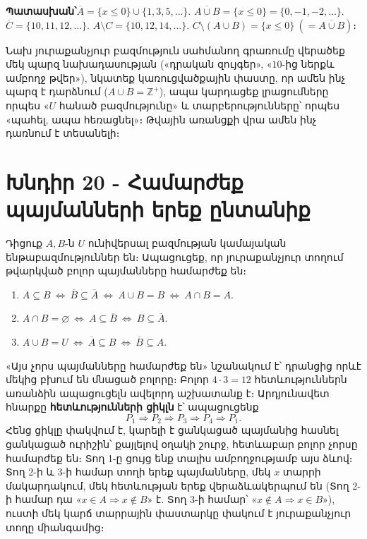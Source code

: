 \documentclass[11pt,a4paper]{article}
\newcommand{\Z}{\mathbb{Z}}
\newcommand{\answer}[1]{\begin{answerbox}\centering\textbf{Պատասխան՝}\quad #1\end{answerbox}}
\begin{document}
\answer{$\overline{A}=\{x\le 0\}\cup\{1,3,5,\dots\}$.\quad
$\overline{A\cup B}=\{x\le 0\}=\{0,-1,-2,\dots\}$.\quad
$\overline{C}=\{10,11,12,\dots\}$.\quad
$A\setminus C=\{10,12,14,\dots\}$.\quad
$C\setminus(A\cup B)=\{x\le 0\}\ (=\overline{A\cup B})$։}

\begin{methodbox}
Նախ յուրաքանչյուր բազմություն սահմանող գրառումը վերածեք մեկ պարզ նախադասության
(«դրական զույգեր», «$10$-ից ներքև ամբողջ թվեր»), նկատեք կառուցվածքային փաստը, որ ամեն ինչ պարզ է դարձնում
($A\cup B=\Z^{+}$), ապա կարդացեք լրացումները որպես «$U$ հանած բազմությունը» և տարբերությունները՝ որպես
«պահել, ապա հեռացնել»։ Թվային առանցքի վրա ամեն ինչ դառնում է տեսանելի։
\end{methodbox}

\section*{Խնդիր 20 - Համարժեք պայմանների երեք ընտանիք}

\begin{problembox}[20]
Դիցուք $A,B$-ն $U$ ունիվերսալ բազմության կամայական ենթաբազմություններ են։ Ապացուցեք, որ յուրաքանչյուր
տողում թվարկված բոլոր պայմանները համարժեք են։
\begin{enumerate}[label=\textbf{Տող \arabic*՝},leftmargin=2cm]
\item $A\subseteq B\ \Longleftrightarrow\ \overline{B}\subseteq\overline{A}\ \Longleftrightarrow\
A\cup B=B\ \Longleftrightarrow\ A\cap B=A$.
\item $A\cap B=\varnothing\ \Longleftrightarrow\ A\subseteq\overline{B}\ \Longleftrightarrow\
B\subseteq\overline{A}$.
\item $A\cup B=U\ \Longleftrightarrow\ \overline{A}\subseteq B\ \Longleftrightarrow\
\overline{B}\subseteq A$.
\end{enumerate}
\end{problembox}

\begin{ideabox}
«Այս չորս պայմանները համարժեք են» նշանակում է՝ դրանցից որևէ մեկից բխում են մնացած բոլորը։ Բոլոր
$4\cdot 3=12$ հետևություններն առանձին ապացուցելն ավելորդ աշխատանք է։ Արդյունավետ հնարքը
\textbf{հետևությունների ցիկլն} է՝ ապացուցենք
$$P_1\Rightarrow P_2\Rightarrow P_3\Rightarrow P_4\Rightarrow P_1.$$
Հենց ցիկլը փակվում է, կարելի է ցանկացած պայմանից հասնել ցանկացած ուրիշին՝ քայլելով օղակի շուրջ, հետևաբար
բոլոր չորսը համարժեք են։ Տող 1-ը ցույց ենք տալիս ամբողջությամբ այս ձևով։ Տող 2-ի և 3-ի համար տողի երեք
պայմանները, մեկ $x$ տարրի մակարդակում, մեկ հետևության երեք վերաձևակերպում են (Տող 2-ի համար դա
«$x\in A\Rightarrow x\notin B$» է. Տող 3-ի համար՝ «$x\notin A\Rightarrow x\in B$»), ուստի մեկ կարճ
տարրային փաստարկը փակում է յուրաքանչյուր տողը միանգամից։
\end{ideabox}
\end{document}
